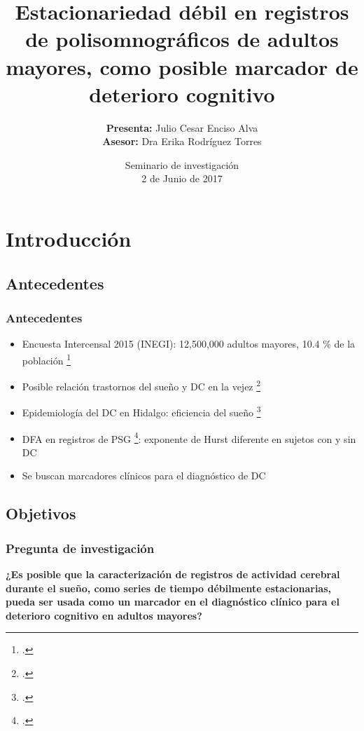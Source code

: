 \documentclass{beamer}
\title[Estacionariedad en PSG de adultos mayores]
{Estacionariedad d\'ebil en registros de polisomnogr\'aficos de adultos mayores, como posible 
marcador de deterioro cognitivo}
\author[Enciso Alva]
{
\textbf{Presenta:} Julio Cesar Enciso Alva\\
\textbf{Asesor:} Dra Erika Rodr\'iguez Torres}
\institute[LIMA]
{\large {Licenciatura en Matem\'aticas Aplicadas}}
\date[Junio 2017]
{Seminario de investigaci\'on\\ 2 de Junio de 2017}
\begin{document}
\frame{\titlepage}


\section{Introducci\'on}


\subsection{Antecedentes}

\begin{frame}\frametitle{Antecedentes}
\begin{itemize}
\item Encuesta Intercensal 2015 (INEGI): 12,500,000 adultos mayores, 10.4 \%  de la poblaci\'on 
\footcite{Intercensal15}

\item Posible relaci\'on trastornos del sue\~no y DC en la vejez \footcite{Miyata13}

\item Epidemiolog\'ia del DC en Hidalgo: eficiencia del sue\~no \footcite{VazquezTagle16}

\item DFA en registros de PSG \footcite{Valeria}: exponente de Hurst diferente en sujetos con y 
sin DC 

\item Se buscan marcadores cl\'inicos para el diagn\'ostico de DC
\end{itemize}
\end{frame}


\subsection{Objetivos}

\begin{frame}\frametitle{Pregunta de investigaci\'on}
\textbf{
¿Es posible que la caracterizaci\'on de registros de actividad cerebral durante el sue\~no, como 
series de tiempo d\'ebilmente estacionarias, pueda ser usada como un marcador en el diagn\'ostico 
cl\'inico para el deterioro cognitivo en adultos mayores?
}
\end{frame}
\end{document}
